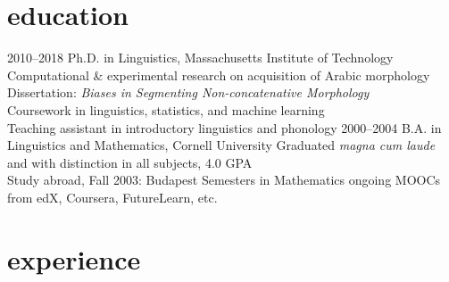 \documentclass[]{friggeri-cv}
\begin{document}


\section{education}

\begin{entrylist}
  \entry
    {2010--2018}
    {Ph.D. in Linguistics, Massachusetts Institute of Technology}
    {}
    {
     \Squaredot Computational \& experimental research on acquisition of Arabic morphology \\
     \Squaredot Dissertation: {\it Biases in Segmenting Non-concatenative Morphology} \\
     \Squaredot Coursework in linguistics, statistics, and machine learning\\
     \Squaredot Teaching assistant in introductory linguistics and phonology
    }
  \entry
    {2000--2004}
    {B.A. in Linguistics and Mathematics, Cornell University}
    {}
    {
    \Squaredot Graduated \emph{magna cum laude} and with distinction in all subjects, 4.0 GPA \\
	\Squaredot Study abroad, Fall 2003: Budapest Semesters in Mathematics}
  \entry
    {ongoing}
    {MOOCs from edX, Coursera, FutureLearn, etc.}
    {}
    {}
\end{entrylist}

\section{experience}
\end{document}
